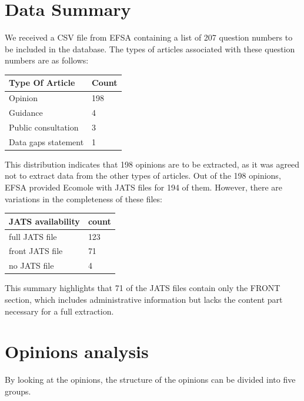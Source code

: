 \documentclass[12pt]{article}
\begin{document}
\section{Data Summary}

We received a CSV file from EFSA containing a list of 207 question numbers to be included in the database. 
The types of articles associated with these question numbers are as follows:

\begin{center}
    \begin{tabular}{| l | l |}
    \hline
    \textbf{Type Of Article} & \textbf{Count} \\
    \hline
    Opinion & 198 \\ 
    Guidance & 4 \\  
    Public consultation & 3 \\
    Data gaps statement & 1  \\
    \hline
    \end{tabular}
\end{center}

This distribution indicates that 198 opinions are to be extracted, as it was agreed not to extract data from the other types of articles.
Out of the 198 opinions, EFSA provided Ecomole with JATS files for 194 of them. However, there are variations in the completeness of these files:

\begin{center}
    \begin{tabular}{| l | l |}
    \hline
    \textbf{JATS availability} & \textbf{count} \\
    \hline
    full JATS file & 123 \\ 
    front JATS file & 71 \\  
    no JATS file & 4 \\
    \hline
    \end{tabular}
\end{center}

This summary highlights that 71 of the JATS files contain only the FRONT section, which includes administrative information but lacks the content part necessary for a full extraction.

\section {Opinions analysis}

By looking at the opinions, the structure of the opinions can be divided into five groups.
\end{document}
